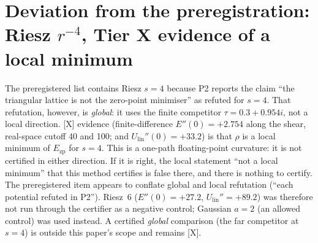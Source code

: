 \documentclass[10pt]{article}
\newcommand{\tier}[1]{\textsf{[#1]}}
\newcommand{\tX}{\tier{X}}
\newcommand{\Ezp}{E_{\mathrm{zp}}}
\newcommand{\Ulin}{U_{\mathrm{lin}}}
\begin{document}
\section{Deviation from the preregistration: Riesz \texorpdfstring{$r^{-4}$}{1/r**4}, Tier X evidence of a local minimum}\label{sec:riesz4}
The preregistered list contains Riesz $s=4$ because P2 reports the claim ``the triangular lattice is not the zero-point minimiser'' as refuted for $s=4$. That refutation, however, is \emph{global}: it uses the finite competitor $\tau=0.3+0.954i$, not a local direction. \tX{} evidence (finite-difference $E''(0)=+2.754$ along the shear, real-space cutoff 40 and 100; and $\Ulin''(0)=+33.2$) is that $\rho$ is a local minimum of $\Ezp$ for $s=4$. This is a one-path floating-point curvature: it is not certified in either direction. If it is right, the local statement ``not a local minimum'' that this method certifies is false there, and there is nothing to certify. The preregistered item appears to conflate global and local refutation (``each potential refuted in P2''). Riesz~6 ($E''(0)=+27.2$, $\Ulin''=+89.2$) was therefore not run through the certifier as a negative control; Gaussian $a=2$ (an allowed control) was used instead. A certified \emph{global} comparison (the far competitor at $s=4$) is outside this paper's scope and remains \tX{}.

\end{document}
